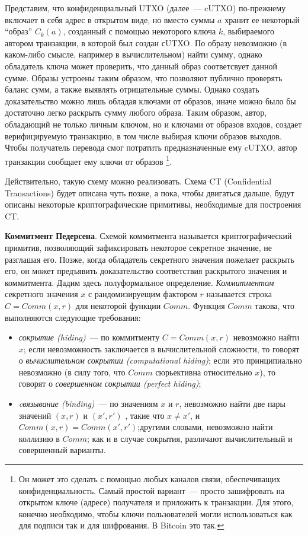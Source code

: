 \documentclass{article}
\begin{document}
  Представим, что конфиденциальный UTXO (далее~--- cUTXO) по-прежнему включает
  в себя адрес в открытом виде,
 но вместо суммы $a$ хранит ее некоторый ``образ'' $C_k(a)$,
 созданный с помощью некоторого ключа $k$, выбираемого автором транзакции, в которой был создан сUTXO.
 По образу невозможно (в каком-либо смысле, например в вычислительном) найти сумму,
 однако обладатель ключа может проверить, что данный образ соответсвует данной сумме.
 Образы устроены таким образом, что позволяют публично проверять баланс сумм,
 а также выявлять отрицательные суммы.
 Однако создать доказательство можно лишь обладая ключами от образов,
 иначе можно было бы достаточно легко раскрыть сумму любого образа.
 Таким образом, автор, обладающий не только личным ключом, но и ключами от образов входов,
  создает верифицируемую транзакцию, в том числе выбирая ключи образов выходов.
 Чтобы получатель перевода смог потратить предназначенные ему cUTXO,
 автор транзакции сообщает ему ключи от образов
 \footnote{Он может это сделать с помощью любых каналов связи, обеспечиващих конфиденциальность.
 Самый простой вариант~--- просто зашифровать на открытом ключе (адресе) получателя и приложить к транзакции.
 Для этого, конечно необходимо, чтобы ключи пользователей могли использоваться как для подписи так и для шифрования.
 В Bitcoin это так.}.

Действительно, такую схему можно реализовать. Схема CT (Confidential Transactions)
будет описана чуть позже, а пока, чтобы двигаться дальше,
будут описаны некоторые криптографические примитивы, необходимые для построения CT.

{\bf Коммитмент Педерсена}.
Схемой коммитмента называется криптографический примитив, позволяющий зафиксировать
некоторое секретное значение, не разглашая его.
Позже, когда обладатель секретного значения пожелает раскрыть его,
он может предъявить доказательство соответствия раскрытого значения и коммитмента.
Дадим здесь полуформальное определение.
\textit{Коммитментом} секретного значения $x$ с рандомизируещим фактором $r$
называется строка $C = Comm(x, r)$ для некоторой функции $Comm$.
Функция $Comm$ такова,
 что выполняются следующие требования:
\begin{itemize}
  \item
   \textit{сокрытие (hiding)}~--- по коммитменту $C = Comm(x,r)$ невозможно найти $x$;
   если невозможность заключается в вычислительной сложности, то говорят о
   \textit{вычислительном сокрытии (computational hiding)};
   если это принципиально невозможно (в силу того, что $Comm$ сюрьективна
   относительно $x$), то говорят о \textit{совершенном сокрытии (perfect hiding)};
  \item
  \textit{cвязывание (binding)}~--- по значениям $x$ и $r$,
  невозможно найти две пары значений $(x, r)$ и $(x', r')$ , такие что $x \neq x'$,
  и $Comm(x,r) = Comm(x', r')$;другими словами, невозможно найти коллизию в $Comm$;
  как и в случае сокрытия, различают вычислительный и совершенный варианты.
\end{itemize}
\end{document}
